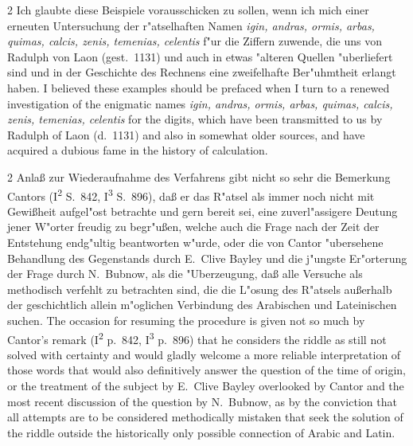 \documentclass[10pt,a4paper]{article}
\renewcommand{\switchcolumn}{\syncronize\nointerlineskip\columnbreak}
\begin{document}
\begin{paracol}{2}
Ich glaubte diese Beispiele vorausschicken zu sollen, wenn ich mich einer erneuten Untersuchung der r"atselhaften Namen \textit{igin, andras, ormis, arbas, quimas, calcis, zenis, temenias, celentis} f"ur die Ziffern zuwende, die uns von Radulph von Laon (gest.\ 1131) und auch in etwas "alteren Quellen "uberliefert sind und in der Geschichte des Rechnens eine zweifelhafte Ber"uhmtheit erlangt haben.
\switchcolumn
I believed these examples should be prefaced when I turn to a renewed investigation of the enigmatic names \textit{igin, andras, ormis, arbas, quimas, calcis, zenis, temenias, celentis} for the digits, which have been transmitted to us by Radulph of Laon (d.\ 1131) and also in somewhat older sources, and have acquired a dubious fame in the history of calculation.
\end{paracol}

\begin{paracol}{2}
Anla\ss{} zur Wiederaufnahme des Verfahrens gibt nicht so sehr die Bemerkung Cantors (I\textsuperscript{2} S.\ 842, I\textsuperscript{3} S.\ 896), da\ss{} er das R"atsel als immer noch nicht mit Gewi\ss{}heit aufgel"ost betrachte und gern bereit sei, eine zuverl"assigere Deutung jener W"orter freudig zu begr"u\ss{}en, welche auch die Frage nach der Zeit der Entstehung endg"ultig beantworten w"urde, oder die von Cantor "ubersehene Behandlung des Gegenstands durch E.\ Clive Bayley und die j"ungste Er"orterung der Frage durch N.\ Bubnow, als die "Uberzeugung, da\ss{} alle Versuche als methodisch verfehlt zu betrachten sind, die die L"osung des R"atsels au\ss{}erhalb der geschichtlich allein m"oglichen Verbindung des Arabischen und Lateinischen suchen.
\switchcolumn
The occasion for resuming the procedure is given not so much by Cantor's remark (I\textsuperscript{2} p.\ 842, I\textsuperscript{3} p.\ 896) that he considers the riddle as still not solved with certainty and would gladly welcome a more reliable interpretation of those words that would also definitively answer the question of the time of origin, or the treatment of the subject by E.\ Clive Bayley overlooked by Cantor and the most recent discussion of the question by N.\ Bubnow, as by the conviction that all attempts are to be considered methodically mistaken that seek the solution of the riddle outside the historically only possible connection of Arabic and Latin.
\end{paracol}
\end{document}
